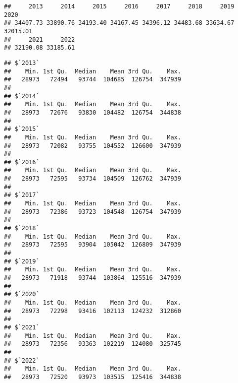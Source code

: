 \documentclass[
]{article}
\newenvironment{Shaded}{\begin{snugshade}}{\end{snugshade}}
\newcommand{\AttributeTok}[1]{\textcolor[rgb]{0.13,0.29,0.53}{#1}}
\newcommand{\ConstantTok}[1]{\textcolor[rgb]{0.56,0.35,0.01}{#1}}
\newcommand{\FunctionTok}[1]{\textcolor[rgb]{0.13,0.29,0.53}{\textbf{#1}}}
\newcommand{\NormalTok}[1]{#1}
\newcommand{\SpecialCharTok}[1]{\textcolor[rgb]{0.81,0.36,0.00}{\textbf{#1}}}
\begin{document}
\begin{Shaded}
\end{Shaded}

\begin{verbatim}
##     2013     2014     2015     2016     2017     2018     2019     2020 
## 34407.73 33890.76 34193.40 34167.45 34396.12 34483.68 33634.67 32015.01 
##     2021     2022 
## 32190.08 33185.61
\end{verbatim}

\begin{Shaded}
\end{Shaded}

\begin{verbatim}
## $`2013`
##    Min. 1st Qu.  Median    Mean 3rd Qu.    Max. 
##   28973   72494   93744  104685  126754  347939 
## 
## $`2014`
##    Min. 1st Qu.  Median    Mean 3rd Qu.    Max. 
##   28973   72676   93830  104482  126754  344838 
## 
## $`2015`
##    Min. 1st Qu.  Median    Mean 3rd Qu.    Max. 
##   28973   72082   93755  104552  126600  347939 
## 
## $`2016`
##    Min. 1st Qu.  Median    Mean 3rd Qu.    Max. 
##   28973   72595   93734  104509  126762  347939 
## 
## $`2017`
##    Min. 1st Qu.  Median    Mean 3rd Qu.    Max. 
##   28973   72386   93723  104548  126754  347939 
## 
## $`2018`
##    Min. 1st Qu.  Median    Mean 3rd Qu.    Max. 
##   28973   72595   93904  105042  126809  347939 
## 
## $`2019`
##    Min. 1st Qu.  Median    Mean 3rd Qu.    Max. 
##   28973   71918   93744  103864  125516  347939 
## 
## $`2020`
##    Min. 1st Qu.  Median    Mean 3rd Qu.    Max. 
##   28973   72298   93416  102113  124232  312860 
## 
## $`2021`
##    Min. 1st Qu.  Median    Mean 3rd Qu.    Max. 
##   28973   72356   93363  102219  124080  325745 
## 
## $`2022`
##    Min. 1st Qu.  Median    Mean 3rd Qu.    Max. 
##   28973   72520   93973  103515  125416  344838
\end{verbatim}
\end{document}
